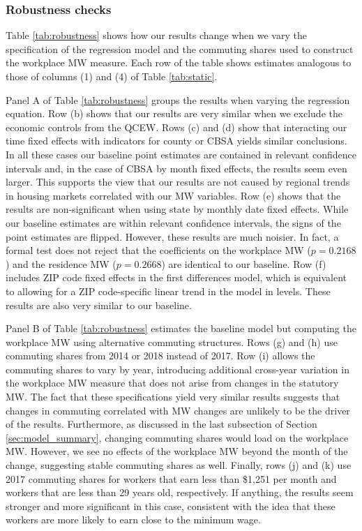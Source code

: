 \subsubsection{Robustness checks}

Table \ref{tab:robustness} shows how our results change when we vary the
specification of the regression model and the commuting shares used 
to construct the workplace MW measure.
Each row of the table shows estimates analogous to those of columns (1) and (4)
of Table \ref{tab:static}.

Panel A of Table \ref{tab:robustness} groups the results when varying the 
regression equation.
Row (b) shows that our results are very similar when we exclude the 
economic controls from the QCEW.
Rows (c) and (d) show that interacting our time fixed effects with indicators 
for county or CBSA yields similar conclusions.
In all these cases our baseline point estimates are contained in relevant 
confidence intervals and, in the case of CBSA by month fixed effects, 
the results seem even larger.
This supports the view that our results are not caused by regional trends 
in housing markets correlated with our MW variables.
Row (e) shows that the results are non-significant when using state by 
monthly date fixed effects.
While our baseline estimates are within relevant confidence intervals, the 
signs of the point estimates are flipped.
However, these results are much noisier.
In fact, a formal test does not reject that the coefficients on the workplace 
MW ($p=0.2168$) and the residence MW ($p=0.2668$) are identical to our baseline.
Row (f) includes ZIP code fixed effects in the first differences model, which
is equivalent to allowing for a ZIP code-specific linear trend in the model in 
levels.
These results are also very similar to our baseline.

Panel B of Table \ref{tab:robustness} estimates the baseline model but 
computing the workplace MW using alternative commuting structures.
Rows (g) and (h) use commuting shares from 2014 or 2018 instead of 2017.
Row (i) allows the commuting shares to vary by year, introducing additional
cross-year variation in the workplace MW measure that does not arise from 
changes in the statutory MW.
The fact that these specifications yield very similar results suggests that 
changes in commuting correlated with MW changes are unlikely to be the driver
of the results.
Furthermore, as discussed in the last subsection of Section \ref{sec:model_summary},
changing commuting shares would load on the workplace MW.
However, we see no effects of the workplace MW beyond the month of the 
change, suggesting stable commuting shares as well.
Finally, rows (j) and (k) use 2017 commuting shares for workers that earn 
less than \$1,251 per month and workers that are less than 29 years old, 
respectively.
If anything, the results seem stronger and more significant in this case, 
consistent with the idea that these workers are more likely to earn close to the 
minimum wage.

